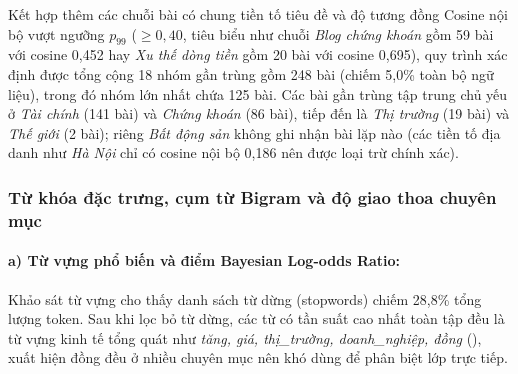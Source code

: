 \begin{table}[H]
  \centering
  \caption{Thống kê số lượng cụm và số bài gần trùng theo các ngưỡng độ tương đồng Cosine n-gram ký tự.}
  \label{tab:text_dup_thresholds}
\end{table}

Kết hợp thêm các chuỗi bài có chung tiền tố tiêu đề và độ tương đồng Cosine nội bộ vượt ngưỡng $p_{99}$ ($\ge 0,40$, tiêu biểu như chuỗi \textit{Blog chứng khoán} gồm 59 bài với cosine 0,452 hay \textit{Xu thế dòng tiền} gồm 20 bài với cosine 0,695), quy trình xác định được tổng cộng 18 nhóm gần trùng gồm 248 bài (chiếm 5,0\% toàn bộ ngữ liệu), trong đó nhóm lớn nhất chứa 125 bài. Các bài gần trùng tập trung chủ yếu ở \textit{Tài chính} (141 bài) và \textit{Chứng khoán} (86 bài), tiếp đến là \textit{Thị trường} (19 bài) và \textit{Thế giới} (2 bài); riêng \textit{Bất động sản} không ghi nhận bài lặp nào (các tiền tố địa danh như \textit{Hà Nội} chỉ có cosine nội bộ 0,186 nên được loại trừ chính xác).

\subsubsection{Từ khóa đặc trưng, cụm từ Bigram và độ giao thoa chuyên mục}

\paragraph{a) Từ vựng phổ biến và điểm Bayesian Log-odds Ratio:}
Khảo sát từ vựng cho thấy danh sách từ dừng (stopwords) chiếm 28,8\% tổng lượng token. Sau khi lọc bỏ từ dừng, các từ có tần suất cao nhất toàn tập đều là từ vựng kinh tế tổng quát như \textit{tăng, giá, thị\_trường, doanh\_nghiệp, đồng} (), xuất hiện đồng đều ở nhiều chuyên mục nên khó dùng để phân biệt lớp trực tiếp.

